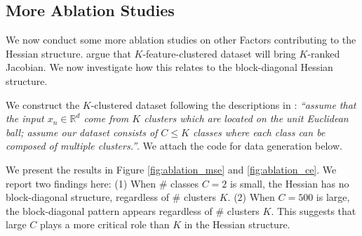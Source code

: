 \documentclass{article}
\newcommand{\1}{^{(1)}}
\newcommand{\2}{^{(2)}}
\begin{document}
\subsection{More Ablation Studies}
\label{appendx_ablation}

We now conduct some more ablation studies on other Factors contributing to the Hessian structure. 
\citet{li2020gradient} argue that $K$-feature-clustered dataset will bring $K$-ranked Jacobian. We now investigate how this relates to the block-diagonal Hessian structure.


We construct the $K$-clustered dataset following the descriptions in \citep{li2020gradient}: {\it ``assume that the input $x_n \in \mathbb{R}^d$ come from $K$ clusters which are located on the unit Euclidean ball; assume our dataset consists of $C\leq K$ classes where each class can be composed of multiple clusters.''}. We attach the code for data generation below. 


We present the results in Figure \ref{fig:ablation_mse} and
\ref{fig:ablation_ce}.
We report two findings here: 
(1) When \# classes $C = 2$ is small, the Hessian has no block-diagonal structure, regardless of \# clusters $K$. (2) When  $C = 500$ is large, the block-diagonal pattern appears regardless of  \# clusters $K$. This suggests that large $C$ plays a more critical role than $K$ in the Hessian structure.  
\end{document}
